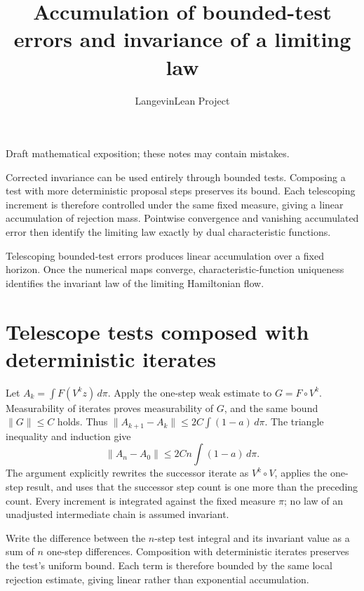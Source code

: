 \documentclass[11pt,a4paper]{article}
\title{\texorpdfstring{Accumulation of bounded-test errors and invariance of a limiting law}{Accumulation of bounded-test errors and invariance of a limiting law}}
\author{LangevinLean Project}
\date{}
\begin{document}
\maketitle
Draft mathematical exposition; these notes may contain mistakes.


Corrected invariance can be used entirely through bounded tests. Composing a test with more deterministic proposal steps preserves its bound. Each telescoping increment is therefore controlled under the same fixed measure, giving a linear accumulation of rejection mass. Pointwise convergence and vanishing accumulated error then identify the limiting law exactly by dual characteristic functions.



Telescoping bounded-test errors produces linear accumulation over a fixed horizon. Once the numerical maps converge, characteristic-function uniqueness identifies the invariant law of the limiting Hamiltonian flow.


\section{\texorpdfstring{Telescope tests composed with deterministic iterates}{Telescope tests composed with deterministic iterates}}


Let \(A_k=\int F(V^kz)\,d\pi\). Apply the one-step weak estimate to \(G=F\circ V^k\). Measurability of iterates proves measurability of \(G\), and the same bound \(\|G\|\le C\) holds. Thus \(\|A_{k+1}-A_k\|\le2C\int(1-a)\,d\pi\). The triangle inequality and induction give \[\|A_n-A_0\|\le2Cn\int(1-a)\,d\pi.\] The argument explicitly rewrites the successor iterate as \(V^k\circ V\), applies the one-step result, and uses that the successor step count is one more than the preceding count. Every increment is integrated against the fixed measure \(\pi\); no law of an unadjusted intermediate chain is assumed invariant.



Write the difference between the \(n\)-step test integral and its invariant value as a sum of \(n\) one-step differences. Composition with deterministic iterates preserves the test’s uniform bound. Each term is therefore bounded by the same local rejection estimate, giving linear rather than exponential accumulation.
\end{document}
